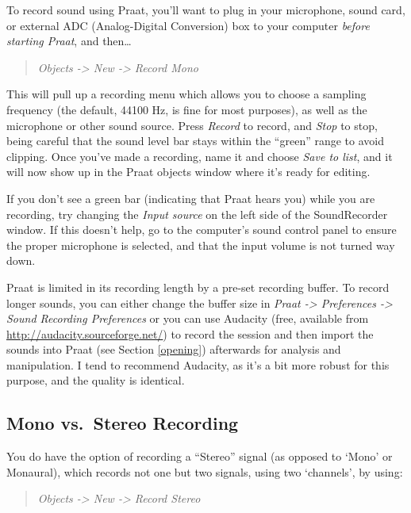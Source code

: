 \documentclass[11pt]{article}
\begin{document}
To record sound using Praat, you'll want to plug in your microphone,
sound card, or external ADC (Analog-Digital Conversion) box to your
computer \emph{before starting Praat}, and then\ldots{}

\begin{quote}
\emph{Objects -\textgreater{} New -\textgreater{} Record Mono}
\end{quote}

This will pull up a recording menu which allows you to choose a sampling
frequency (the default, 44100 Hz, is fine for most purposes), as well as
the microphone or other sound source. Press \emph{Record} to record, and
\emph{Stop} to stop, being careful that the sound level bar stays within
the ``green'' range to avoid clipping. Once you've made a recording,
name it and choose \emph{Save to list}, and it will now show up in the
Praat objects window where it's ready for editing.

If you don't see a green bar (indicating that Praat hears you) while you
are recording, try changing the \emph{Input source} on the left side of
the SoundRecorder window. If this doesn't help, go to the computer's
sound control panel to ensure the proper microphone is selected, and
that the input volume is not turned way down.

Praat is limited in its recording length by a pre-set recording buffer.
To record longer sounds, you can either change the buffer size in
\emph{Praat -\textgreater{} Preferences -\textgreater{} Sound Recording
Preferences} or you can use Audacity (free, available from
\url{http://audacity.sourceforge.net/}) to record the session and then
import the sounds into Praat (see Section \ref{opening}) afterwards for
analysis and manipulation. I tend to recommend Audacity, as it's a bit
more robust for this purpose, and the quality is identical.

\hypertarget{mono-vs.-stereo-recording}{%
\subsection{Mono vs.~Stereo Recording}\label{mono-vs.-stereo-recording}}

\label{sec:stereo}

You do have the option of recording a ``Stereo'' signal (as opposed to
`Mono' or Monaural), which records not one but two signals, using two
`channels', by using:

\begin{quote}
\emph{Objects -\textgreater{} New -\textgreater{} Record Stereo}
\end{quote}
\end{document}
